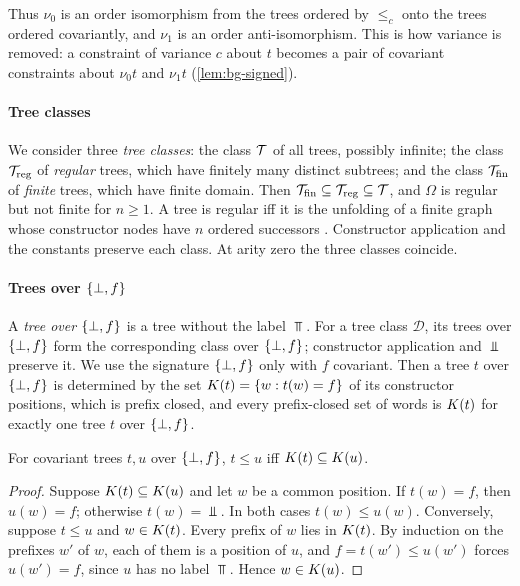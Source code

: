 Thus $\nu_0$ is an order isomorphism from the trees ordered by $\le_c$ onto the
trees ordered covariantly, and $\nu_1$ is an order anti-isomorphism. This is
how variance is removed: a constraint of variance $c$ about $t$ becomes a pair
of covariant constraints about $\nu_0t$ and $\nu_1t$
(\cref{lem:bg-signed}).

\paragraph{Tree classes}
We consider three \emph{tree classes}: the class $\mathcal{T}$ of all trees,
possibly infinite; the class $\mathcal{T}_{\mathrm{reg}}$ of \emph{regular} trees,
which have finitely many distinct subtrees; and the class $\mathcal{T}_{\mathrm{fin}}$
of \emph{finite} trees, which have finite domain. Then
$\mathcal{T}_{\mathrm{fin}}\subseteq\mathcal{T}_{\mathrm{reg}}\subseteq\mathcal{T}$, and
$\Omega$ is regular but not finite for $n\ge1$. A tree is regular iff it is the
unfolding of a finite graph whose constructor nodes have $n$ ordered successors
. Constructor application and the
constants preserve each class. At arity zero the three classes coincide.

\paragraph{Trees over $\{\bot,f\}$}
A \emph{tree over $\{\bot,f\}$} is a tree without the label $\Top$. For a tree class
$\mathcal D$, its trees over $\{\bot,f\}$ form the corresponding class over $\{\bot,f\}$;
constructor application and $\Bot$ preserve it. We use the signature $\{\bot,f\}$ only
with $f$ covariant. Then a tree $t$ over $\{\bot,f\}$ is determined by the set
$K(t)=\{w:t(w)=f\}$ of its constructor positions, which is prefix closed,
and every prefix-closed set of words is $K(t)$ for exactly one tree $t$
over $\{\bot,f\}$.

\begin{lemma}\label{lem:bg-bf-order}
For covariant trees $t,u$ over $\{\bot,f\}$, $t\le u$ iff $K(t)\subseteq K(u)$.
\end{lemma}
\begin{proof}
Suppose $K(t)\subseteq K(u)$ and let $w$ be a common position. If
$t(w)=f$, then $u(w)=f$; otherwise $t(w)=\Bot$. In both cases
$t(w)\le u(w)$. Conversely, suppose $t\le u$ and $w\in K(t)$. Every prefix of
$w$ lies in $K(t)$. By induction on the prefixes $w'$ of $w$, each of them
is a position of $u$, and $f=t(w')\le u(w')$ forces $u(w')=f$, since $u$ has no
label $\Top$. Hence $w\in K(u)$.
\end{proof}

